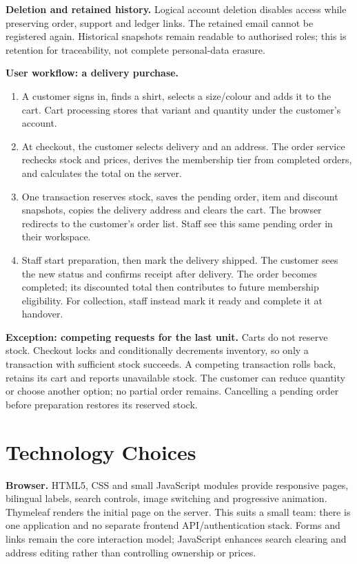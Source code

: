 \textbf{Deletion and retained history.} Logical account deletion disables access while preserving order, support and ledger links. The retained email cannot be registered again. Historical snapshots remain readable to authorised roles; this is retention for traceability, not complete personal-data erasure.

\newpage
\textbf{User workflow: a delivery purchase.}
\begin{enumerate}
\item A customer signs in, finds a shirt, selects a size/colour and adds it to the cart. Cart processing stores that variant and quantity under the customer's account.
\item At checkout, the customer selects delivery and an address. The order service rechecks stock and prices, derives the membership tier from completed orders, and calculates the total on the server.
\item One transaction reserves stock, saves the pending order, item and discount snapshots, copies the delivery address and clears the cart. The browser redirects to the customer's order list. Staff see this same pending order in their workspace.
\item Staff start preparation, then mark the delivery shipped. The customer sees the new status and confirms receipt after delivery. The order becomes completed; its discounted total then contributes to future membership eligibility. For collection, staff instead mark it ready and complete it at handover.
\end{enumerate}
\textbf{Exception: competing requests for the last unit.} Carts do not reserve stock. Checkout locks and conditionally decrements inventory, so only a transaction with sufficient stock succeeds. A competing transaction rolls back, retains its cart and reports unavailable stock. The customer can reduce quantity or choose another option; no partial order remains. Cancelling a pending order before preparation restores its reserved stock.

\section{Technology Choices}
\textbf{Browser.} HTML5, CSS and small JavaScript modules provide responsive pages, bilingual labels, search controls, image switching and progressive animation. Thymeleaf renders the initial page on the server. This suits a small team: there is one application and no separate frontend API/authentication stack. Forms and links remain the core interaction model; JavaScript enhances search clearing and address editing rather than controlling ownership or prices.

